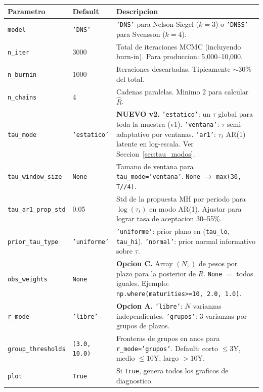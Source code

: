 \documentclass[12pt, a4paper]{article}
\theoremstyle{plain}
\theoremstyle{definition}
\theoremstyle{remark}
\begin{document}
\begin{longtable}{L{3.8cm} L{2cm} L{8.2cm}}
\toprule
\textbf{Parametro} & \textbf{Default} & \textbf{Descripcion} \\
\midrule
\endhead
\bottomrule
\endfoot

\texttt{model} & \texttt{'DNS'} &
  \texttt{'DNS'} para Nelson-Siegel ($k=3$) o
  \texttt{'DNSS'} para Svensson ($k=4$). \\
\addlinespace
\texttt{n\_iter} & 3000 &
  Total de iteraciones MCMC (incluyendo burn-in).
  Para produccion: 5,000--10,000. \\
\addlinespace
\texttt{n\_burnin} & 1000 &
  Iteraciones descartadas. Tipicamente $\sim 30\%$ del total. \\
\addlinespace
\texttt{n\_chains} & 4 &
  Cadenas paralelas. Minimo 2 para calcular $\hat{R}$. \\
\addlinespace
\texttt{tau\_mode} & \texttt{'estatico'} &
  \textbf{NUEVO v2.}
  \texttt{'estatico'}: un $\tau$ global para toda la muestra (v1).
  \texttt{'ventana'}: $\tau$ semi-adaptativo por ventanas.
  \texttt{'ar1'}: $\tau_t$ AR(1) latente en log-escala.
  Ver Seccion~\ref{sec:tau_modos}. \\
\addlinespace
\texttt{tau\_window\_size} & \texttt{None} &
  Tamano de ventana para \texttt{tau\_mode='ventana'}.
  \texttt{None} $\to$ \texttt{max(30, T//4)}. \\
\addlinespace
\texttt{tau\_ar1\_prop\_std} & 0.05 &
  Std de la propuesta MH por periodo para $\log(\tau_t)$ en modo AR(1).
  Ajustar para lograr tasa de aceptacion 30--55\%. \\
\addlinespace
\texttt{prior\_tau\_type} & \texttt{'uniforme'} &
  \texttt{'uniforme'}: prior plano en (\texttt{tau\_lo}, \texttt{tau\_hi}).
  \texttt{'normal'}: prior normal informativo sobre $\tau$. \\
\addlinespace
\texttt{obs\_weights} & \texttt{None} &
  \textbf{Opcion C.} Array $(N,)$ de pesos por plazo para la posterior de $R$.
  \texttt{None} $=$ todos iguales.
  Ejemplo: \texttt{np.where(maturities>=10, 2.0, 1.0)}. \\
\addlinespace
\texttt{r\_mode} & \texttt{'libre'} &
  \textbf{Opcion A.}
  \texttt{'libre'}: $N$ varianzas independientes.
  \texttt{'grupos'}: 3 varianzas por grupos de plazos. \\
\addlinespace
\texttt{group\_thresholds} & \texttt{(3.0, 10.0)} &
  Fronteras de grupos en anos para \texttt{r\_mode='grupos'}.
  Default: corto $\leq 3$Y, medio $\leq 10$Y, largo $> 10$Y. \\
\addlinespace
\texttt{plot} & \texttt{True} &
  Si \texttt{True}, genera todos los graficos de diagnostico. \\

\end{longtable}
\end{document}
